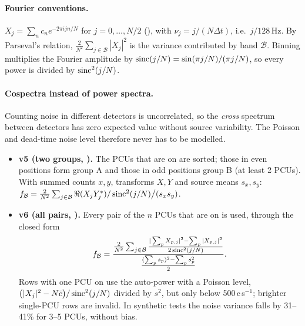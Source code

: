 \paragraph{Fourier conventions.} $X_j=\sum_nc_ne^{-2\pi ijn/N}$ for $j=0,\dots,N/2$ (), with
$\nu_j=j/(N\Delta t)$, i.e.\ $j/128$\,Hz. By Parseval's relation, $\frac{2}{N^2}\sum_{j\in\mathcal B}|X_j|^2$ is the variance
contributed by band $\mathcal B$. Binning multiplies the Fourier amplitude by $\operatorname{sinc}(j/N)=\sin(\pi j/N)/(\pi j/N)$, so every
power is divided by $\operatorname{sinc}^2(j/N)$.

\paragraph{Cospectra instead of power spectra.} Counting noise in different detectors is uncorrelated, so the
\emph{cross} spectrum between detectors has zero expected value without source variability. The Poisson and dead-time
noise level therefore never has to be modelled.
\begin{itemize}
\item \textbf{v5 (two groups, ).} The PCUs that are on are sorted; those in even positions form
group A and those in odd positions group B (at least 2 PCUs). With summed counts $x,y$, transforms $X,Y$ and source means
$s_x,s_y$: $f_\mathcal B=\frac{2}{N^2}\sum_{j\in\mathcal B}\Re(X_jY_j^*)/\operatorname{sinc}^2(j/N)\big/(s_xs_y)$.
\item \textbf{v6 (all pairs, ).} Every pair of the $n$ PCUs that are on is used, through the closed
form
\begin{equation}
f_\mathcal B=\frac{\frac{2}{N^2}\sum_{j\in\mathcal B}\frac{|\sum_pX_{p,j}|^2-\sum_p|X_{p,j}|^2}{2\operatorname{sinc}^2(j/N)}}{\frac{(\sum_ps_p)^2-\sum_ps_p^2}{2}}.\label{eq:allpairs}
\end{equation}
Rows with one PCU on use the auto-power with a Poisson level, $\bigl(|X_j|^2-N\bar c\bigr)/\operatorname{sinc}^2(j/N)$ divided by $s^2$,
but only below 500\,c\,s$^{-1}$; brighter single-PCU rows are invalid. In synthetic tests the noise variance falls by
31--41\% for 3--5 PCUs, without bias.
\end{itemize}

